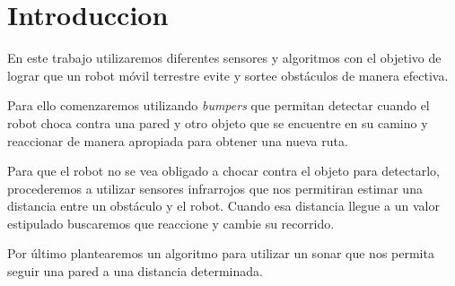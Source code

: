 \section{Introduccion}

En este trabajo utilizaremos diferentes sensores y algoritmos con el objetivo de lograr que un robot móvil terrestre evite y sortee obstáculos de manera efectiva.

Para ello comenzaremos utilizando \textit{bumpers} que permitan detectar cuando el robot choca contra una pared y otro objeto que se encuentre en su camino y reaccionar de manera apropiada para obtener una nueva ruta.

Para que el robot no se vea obligado a chocar contra el objeto para detectarlo, procederemos a utilizar sensores infrarrojos que nos permitiran estimar una distancia entre un obstáculo y el robot. Cuando esa distancia llegue a un valor estipulado buscaremos que reaccione y cambie su recorrido.

Por último plantearemos un algoritmo para utilizar un sonar que nos permita seguir una pared a una distancia determinada.